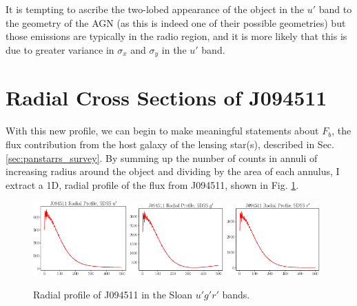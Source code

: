 \documentclass[a4paper,11pt]{article}
\begin{document}
It is tempting to ascribe the two-lobed appearance of the object in the $u'$ band to the geometry of the AGN (as this is indeed one of their possible geometries) but those emissions are typically in the radio region, and it is more likely that this is due to greater variance in $\sigma_x$ and $\sigma_y$ in the $u'$ band.

\section{Radial Cross Sections of J094511}

With this new profile, we can begin to make meaningful statements about $F_b$, the flux contribution from the host galaxy of the lensing star(s), described in Sec. \ref{sec:panstarrs_survey}. By summing up the number of counts in annuli of increasing radius around the object and dividing by the area of each annulus, I extract a 1D, radial profile of the flux from J094511, shown in Fig. \ref{fig:radial_profiles}.

\begin{figure}[h!]
    \includegraphics[width=0.32\textwidth]{J094511_U_annulus_flux.eps}
    \includegraphics[width=0.32\textwidth]{J094511_G_annulus_flux.eps}
    \includegraphics[width=0.32\textwidth]{J094511_R_annulus_flux.eps}
    \caption{Radial profile of J094511 in the Sloan $u'g'r'$ bands.}
    \label{fig:radial_profiles}
\end{figure}
\end{document}
